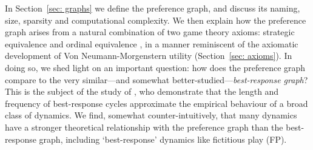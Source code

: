 \documentclass[preprint,authoryear]{elsarticle}
\begin{document}
In Section~\ref{sec: graphs} we define the preference graph, and discuss its naming, size, sparsity and computational complexity. We then explain how the preference graph arises from a natural combination of two game theory axioms: strategic equivalence \citep{moulin1978strategically} and ordinal equivalence \citep{cruz_ordinal_2000}, in a manner reminiscent of the axiomatic development of Von Neumann-Morgenstern utility \citep{von2007theory} (Section~\ref{sec: axioms}). In doing so, we shed light on an important question: how does the preference graph compare to the very similar---and somewhat better-studied---\emph{best-response graph}? This is the subject of the study of \cite{pangallo_best_2019}, who demonstrate that the length and frequency of best-response cycles approximate the empirical behaviour of a broad class of dynamics. We find, somewhat counter-intuitively, that many dynamics have a stronger theoretical relationship with the preference graph than the best-response graph, including `best-response' dynamics like fictitious play (FP). %
\end{document}
